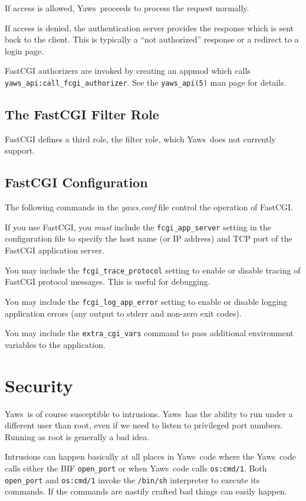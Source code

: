 \documentclass[11pt,oneside,english]{book}
\newcommand{\Yaws}            %
        {{\sc Yaws}}
\begin{document}
If access is allowed, \Yaws\ proceeds to process the request normally.

If access is denied, the authentication server provides the
response which is sent back to the client. This is typically
a ``not authorized'' response or a redirect to a login page.

FastCGI authorizers are invoked by creating an appmod which
calls \verb+yaws_api:call_fcgi_authorizer+.
See the \verb+yaws_api(5)+ man page for details.

\section{The FastCGI Filter Role}

FastCGI defines a third role, the filter role, which
\Yaws\  does not currently support.


\section{FastCGI Configuration}

The following commands in the \textit{yaws.conf} file control the
operation of FastCGI.

If you use FastCGI, you \emph{must} include the \verb+fcgi_app_server+
setting in the configuration file to specify the host name (or IP address)
and TCP port of the FastCGI application server.

You may include the \verb+fcgi_trace_protocol+ setting to enable or disable
tracing of FastCGI protocol messages. This is useful for debugging.

You may include the \verb+fcgi_log_app_error+ setting to enable or disable
logging application errors (any output to stderr and non-zero exit codes).

You may include the \verb+extra_cgi_vars+ command to pass additional
environment variables to the application.


\chapter{Security}

\Yaws\  is of course susceptible to intrusions. \Yaws\  has the
ability to run under a different user than root, even if we need
to listen to privileged port numbers. Running as root is generally a
bad idea.

Intrusions can happen basically at all places in \Yaws\ code where the
\Yaws\ code calls either the BIF \verb+open_port+ or when \Yaws\ code
calls \verb+os:cmd/1+. Both \verb+open_port+ and \verb+os:cmd/1+
invoke the \verb+/bin/sh+ interpreter to execute its commands. If the
commands are nastily crafted bad things can easily happen.
\end{document}
